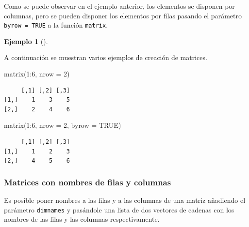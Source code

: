 \documentclass[
  a4paper,
]{scrreport}
\newenvironment{Shaded}{\begin{snugshade}}{\end{snugshade}}
\newcommand{\AttributeTok}[1]{\textcolor[rgb]{0.40,0.45,0.13}{#1}}
\newcommand{\ConstantTok}[1]{\textcolor[rgb]{0.56,0.35,0.01}{#1}}
\newcommand{\DecValTok}[1]{\textcolor[rgb]{0.68,0.00,0.00}{#1}}
\newcommand{\FunctionTok}[1]{\textcolor[rgb]{0.28,0.35,0.67}{#1}}
\newcommand{\NormalTok}[1]{\textcolor[rgb]{0.00,0.23,0.31}{#1}}
\newcommand{\SpecialCharTok}[1]{\textcolor[rgb]{0.37,0.37,0.37}{#1}}
\theoremstyle{definition}
\theoremstyle{definition}
\newtheorem{example}{Ejemplo}[chapter]
\theoremstyle{remark}
\begin{document}
Como se puede observar en el ejemplo anterior, los elementos se disponen
por columnas, pero se pueden disponer los elementos por filas pasando el
parámetro \texttt{byrow\ =\ TRUE} a la función \texttt{matrix}.

\leavevmode{}%
\begin{example}[]\label{exm-creacion-matrices-por-filas}

A continuación se muestran varios ejemplos de creación de matrices.

\begin{Shaded}
\begin{Highlighting}[]
\FunctionTok{matrix}\NormalTok{(}\DecValTok{1}\SpecialCharTok{:}\DecValTok{6}\NormalTok{, }\AttributeTok{nrow =} \DecValTok{2}\NormalTok{)}
\end{Highlighting}
\end{Shaded}

\begin{verbatim}
     [,1] [,2] [,3]
[1,]    1    3    5
[2,]    2    4    6
\end{verbatim}

\begin{Shaded}
\begin{Highlighting}[]
\FunctionTok{matrix}\NormalTok{(}\DecValTok{1}\SpecialCharTok{:}\DecValTok{6}\NormalTok{, }\AttributeTok{nrow =} \DecValTok{2}\NormalTok{, }\AttributeTok{byrow =} \ConstantTok{TRUE}\NormalTok{)}
\end{Highlighting}
\end{Shaded}

\begin{verbatim}
     [,1] [,2] [,3]
[1,]    1    2    3
[2,]    4    5    6
\end{verbatim}

\end{example}

\hypertarget{matrices-con-nombres-de-filas-y-columnas}{%
\subsubsection{Matrices con nombres de filas y
columnas}\label{matrices-con-nombres-de-filas-y-columnas}}

Es posible poner nombres a las filas y a las columnas de una matriz
añadiendo el parámetro \texttt{dimnames} y pasándole una lista de dos
vectores de cadenas con los nombres de las filas y las columnas
respectivamente.
\end{document}

